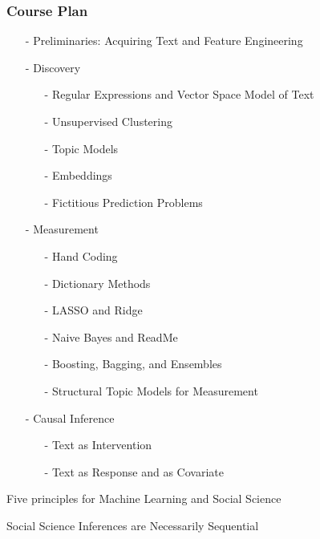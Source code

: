 \documentclass{beamer}
\numberwithin{equation}{section}
\begin{document}
\begin{frame}
\frametitle{Course Plan}

\begin{itemize}
\item[-] Preliminaries: Acquiring Text and Feature Engineering
\item[-] Discovery 
\begin{itemize}
\item[-] Regular Expressions and Vector Space Model of Text
\item[-] Unsupervised Clustering 
\item[-] Topic Models
\item[-] Embeddings 
\item[-] Fictitious Prediction Problems
\end{itemize}  
\item[-] Measurement
\begin{itemize}
  \item[-] Hand Coding
  \item[-] Dictionary Methods
  \item[-] LASSO and Ridge
  \item[-] Naive Bayes and ReadMe
  \item[-] Boosting, Bagging, and Ensembles
  \item[-] Structural Topic Models for Measurement
\end{itemize}
\item[-] Causal Inference
\begin{itemize}
\item[-] Text as Intervention
\item[-] Text as Response and as Covariate
\end{itemize}  
\end{itemize}  

\end{frame}



\begin{frame}

\huge
Five principles for Machine Learning and Social Science

\end{frame}


\begin{frame}
\huge 
Social Science Inferences are Necessarily Sequential \pause  \\




\end{frame}
\end{document}
